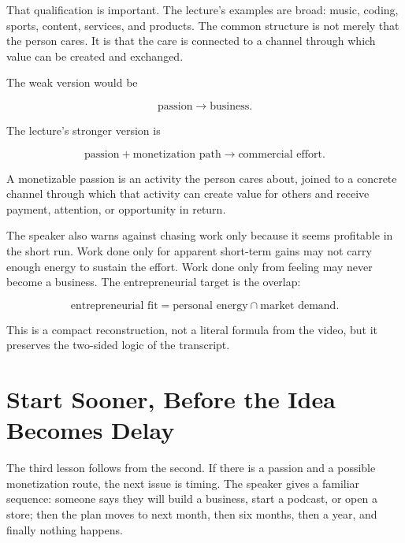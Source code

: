 That qualification is important. The lecture's examples are broad: music, coding, sports, content, services, and products. The common structure is not merely that the person cares. It is that the care is connected to a channel through which value can be created and exchanged.

The weak version would be

\begin{equation}
\text{passion}\longrightarrow\text{business}.
\end{equation}

The lecture's stronger version is

\begin{equation}
\text{passion}+\text{monetization path}
\longrightarrow
\text{commercial effort}.
\end{equation}

\begin{definition}
A monetizable passion is an activity the person cares about, joined to a concrete channel through which that activity can create value for others and receive payment, attention, or opportunity in return.
\end{definition}

The speaker also warns against chasing work only because it seems profitable in the short run. Work done only for apparent short-term gains may not carry enough energy to sustain the effort. Work done only from feeling may never become a business. The entrepreneurial target is the overlap:

\begin{equation}
\text{entrepreneurial fit}
=
\text{personal energy}
\cap
\text{market demand}.
\end{equation}

This is a compact reconstruction, not a literal formula from the video, but it preserves the two-sided logic of the transcript.

\section{Start Sooner, Before the Idea Becomes Delay}

The third lesson follows from the second. If there is a passion and a possible monetization route, the next issue is timing. The speaker gives a familiar sequence: someone says they will build a business, start a podcast, or open a store; then the plan moves to next month, then six months, then a year, and finally nothing happens.

